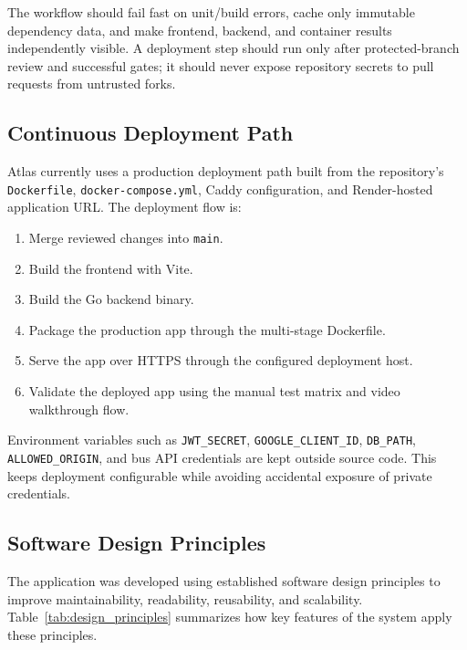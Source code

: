 \documentclass[11pt]{article}
\begin{document}
The workflow should fail fast on unit/build errors, cache only immutable dependency data, and make frontend, backend, and container results independently visible. A deployment step should run only after protected-branch review and successful gates; it should never expose repository secrets to pull requests from untrusted forks.

\subsection*{Continuous Deployment Path}

Atlas currently uses a production deployment path built from the repository's \texttt{Dockerfile}, \texttt{docker-compose.yml}, Caddy configuration, and Render-hosted application URL. The deployment flow is:

\begin{enumerate}[leftmargin=*]
    \item Merge reviewed changes into \texttt{main}.
    \item Build the frontend with Vite.
    \item Build the Go backend binary.
    \item Package the production app through the multi-stage Dockerfile.
    \item Serve the app over HTTPS through the configured deployment host.
    \item Validate the deployed app using the manual test matrix and video walkthrough flow.
\end{enumerate}

Environment variables such as \texttt{JWT\_SECRET}, \texttt{GOOGLE\_CLIENT\_ID}, \texttt{DB\_PATH}, \texttt{ALLOWED\_ORIGIN}, and bus API credentials are kept outside source code. This keeps deployment configurable while avoiding accidental exposure of private credentials.

\subsection*{Software Design Principles}

The application was developed using established software design principles to improve maintainability, readability, reusability, and scalability. Table~\ref{tab:design_principles} summarizes how key features of the system apply these principles.
\end{document}
